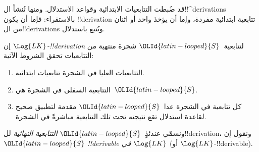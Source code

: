 \documentclass[../../../include/open-logic-section]{subfiles}
\begin{document}
      {}
      {}


\begin{explain}
قد ضُبطت التتابعيات الابتدائية وقواعد الاستدلال. ومنها تُنشأ ال!!^{derivation}s بالاستقراء:
فإما أن يكون !!{derivation} تتابعية ابتدائية مفردة، وإما أن يؤخذ واحد أو اثنان من ال!!{derivation}s ويُتبع باستدلال.
\end{explain}

\begin{defn}
إن \emph{$\Log{LK}$-!!{derivation}} لتتابعية~$\OLId{latin-looped}{S}$ شجرة منتهية من
التتابعيات تحقق الشروط الآتية:
\begin{enumerate}
\item التتابعيات العليا في الشجرة تتابعيات ابتدائية.
\item التتابعية السفلى في الشجرة هي~$\OLId{latin-looped}{S}$.
\item كل تتابعية في الشجرة عدا~$\OLId{latin-looped}{S}$ مقدمة لتطبيق صحيح لقاعدة استدلال
  تقع نتيجته تحت تلك التتابعية مباشرةً في الشجرة.
\end{enumerate}
ونسمّي عندئذٍ~$\OLId{latin-looped}{S}$ \emph{التتابعية النهائية} لل!!{derivation}، ونقول
إن~$\OLId{latin-looped}{S}$ \emph{!!{derivable} في $\Log{LK}$} (أو
$\Log{LK}$-!!{derivable}).
\end{defn}
\end{document}
